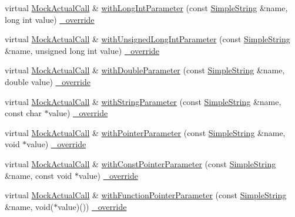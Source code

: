 \begin{DoxyCompactItemize}
\item 
virtual \hyperlink{class_mock_actual_call}{Mock\+Actual\+Call} \& \hyperlink{class_mock_checked_actual_call_ac7e0b15690e2805d19d6228e5760fb48}{with\+Long\+Int\+Parameter} (const \hyperlink{class_simple_string}{Simple\+String} \&name, long int value) \hyperlink{_cpp_u_test_config_8h_a049bea15dd750e15869863c94c1efc3b}{\+\_\+override}
\item 
virtual \hyperlink{class_mock_actual_call}{Mock\+Actual\+Call} \& \hyperlink{class_mock_checked_actual_call_a6cbc626f3ed2fde276f312b1bef0a2d4}{with\+Unsigned\+Long\+Int\+Parameter} (const \hyperlink{class_simple_string}{Simple\+String} \&name, unsigned long int value) \hyperlink{_cpp_u_test_config_8h_a049bea15dd750e15869863c94c1efc3b}{\+\_\+override}
\item 
virtual \hyperlink{class_mock_actual_call}{Mock\+Actual\+Call} \& \hyperlink{class_mock_checked_actual_call_a371849c6448ad5be782bceaaa0b24383}{with\+Double\+Parameter} (const \hyperlink{class_simple_string}{Simple\+String} \&name, double value) \hyperlink{_cpp_u_test_config_8h_a049bea15dd750e15869863c94c1efc3b}{\+\_\+override}
\item 
virtual \hyperlink{class_mock_actual_call}{Mock\+Actual\+Call} \& \hyperlink{class_mock_checked_actual_call_acb9ba4f9dcae3f471876fb264a17e378}{with\+String\+Parameter} (const \hyperlink{class_simple_string}{Simple\+String} \&name, const char $\ast$value) \hyperlink{_cpp_u_test_config_8h_a049bea15dd750e15869863c94c1efc3b}{\+\_\+override}
\item 
virtual \hyperlink{class_mock_actual_call}{Mock\+Actual\+Call} \& \hyperlink{class_mock_checked_actual_call_abe2fcf61a29026f8ffad47510cb6ec3d}{with\+Pointer\+Parameter} (const \hyperlink{class_simple_string}{Simple\+String} \&name, void $\ast$value) \hyperlink{_cpp_u_test_config_8h_a049bea15dd750e15869863c94c1efc3b}{\+\_\+override}
\item 
virtual \hyperlink{class_mock_actual_call}{Mock\+Actual\+Call} \& \hyperlink{class_mock_checked_actual_call_adc22caa39fd9a9e46aafa15b53411d96}{with\+Const\+Pointer\+Parameter} (const \hyperlink{class_simple_string}{Simple\+String} \&name, const void $\ast$value) \hyperlink{_cpp_u_test_config_8h_a049bea15dd750e15869863c94c1efc3b}{\+\_\+override}
\item 
virtual \hyperlink{class_mock_actual_call}{Mock\+Actual\+Call} \& \hyperlink{class_mock_checked_actual_call_a19155cf30218ca00da2321713b1f6aa0}{with\+Function\+Pointer\+Parameter} (const \hyperlink{class_simple_string}{Simple\+String} \&name, void($\ast$value)()) \hyperlink{_cpp_u_test_config_8h_a049bea15dd750e15869863c94c1efc3b}{\+\_\+override}

\end{DoxyCompactItemize}
